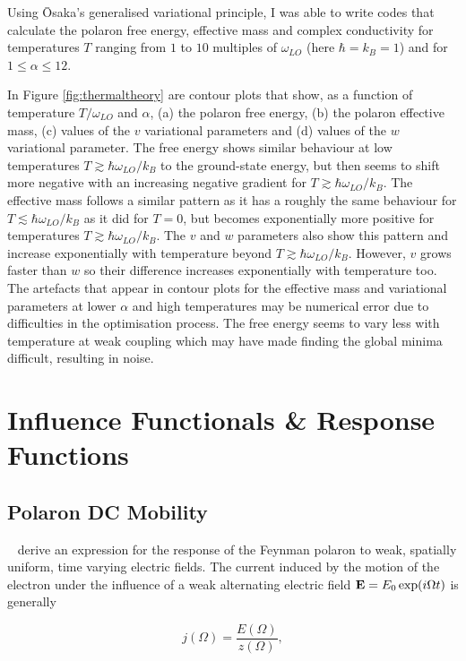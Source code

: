Using \=Osaka's generalised variational principle, I was able to write codes that calculate the polaron free energy, effective mass and complex conductivity for temperatures $T$ ranging from $1$ to $10$ multiples of $\omega_{LO}$ (here $\hbar = k_B = 1$) and for $1\leq\alpha\leq12$. 

In Figure \ref{fig:thermaltheory} are contour plots that show, as a function of temperature $T / \omega_{LO}$ and $\alpha$, (a) the polaron free energy, (b) the polaron effective mass, (c) values of the $v$ variational parameters and (d) values of the $w$ variational parameter. The free energy shows similar behaviour at low temperatures $T \gtrsim \hbar \omega_{LO} / k_B$ to the ground-state energy, but then seems to shift more negative with an increasing negative gradient for $T \gtrsim \hbar \omega_{LO} / k_B$. The effective mass follows a similar pattern as it has a roughly the same behaviour for $T \lesssim \hbar \omega_{LO} / k_B$ as it did for $T = 0$, but becomes exponentially more positive for temperatures $T \gtrsim \hbar \omega_{LO} / k_B$. The $v$ and $w$ parameters also show this pattern and increase exponentially with temperature beyond $T \gtrsim \hbar \omega_{LO} / k_B$. However, $v$ grows faster than $w$ so their difference increases exponentially with temperature too. The artefacts that appear in contour plots for the effective mass and variational parameters at lower $\alpha$ and high temperatures may be numerical error due to difficulties in the optimisation process. The free energy seems to vary less with temperature at weak coupling which may have made finding the global minima difficult, resulting in noise. 

\section{Influence Functionals \& Response Functions}
\label{sec:2-3}

\subsection{Polaron DC Mobility}
\label{subsec:2-3-1}

~\cite{feynman_mobility_1962} derive an expression for the response of the Feynman polaron to weak, spatially uniform, time varying electric fields. The current induced by the motion of the electron under the influence of a weak  alternating electric field $\vb{E} = E_0 \exp(i \Omega t)$ is generally

\begin{equation}
    j(\Omega) = \frac{E(\Omega)}{z(\Omega)} ,
\end{equation}

